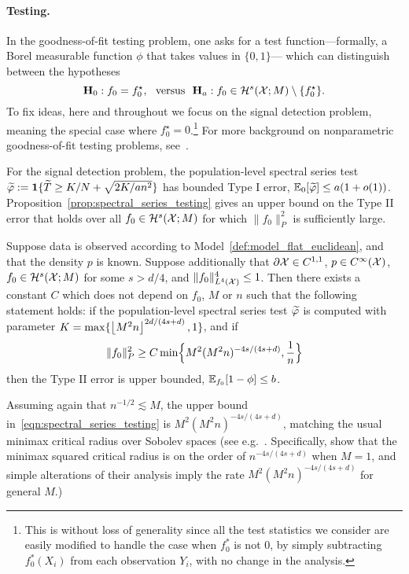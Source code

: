 \paragraph{Testing.}
In the goodness-of-fit testing problem, one asks for a test function---formally, a Borel measurable function $\phi$ that takes values in $\{0,1\}$--- which can distinguish between the hypotheses
\begin{equation}
\mathbf{H}_0: f_0 = f_0^{\star}, ~~\textrm{versus}~~ \mathbf{H}_a: f_0 \in \mathcal{H}^{s}(\mathcal{X};M) \setminus \{f_0^{\star}\}.
\end{equation} 
To fix ideas, here and throughout we focus on the signal detection problem, meaning the special case where $f_0^{\star} = 0$.\footnote{This is without loss of generality since all the test statistics we consider are easily modified to handle the case when $f_0^{\ast}$ is not $0$, by simply subtracting $f_0^{\ast}(X_i)$ from each observation $Y_i$, with no change in the analysis.} For more background on nonparametric goodness-of-fit testing problems, see~\cite{ingster2012}.

For the signal detection problem, the population-level spectral series test $\widetilde{\varphi} := \mathbf{1}\{\widetilde{T} \geq K/N + \sqrt{2K/an^2}\}$ has bounded Type I error, $\mathbb{E}_{0}[\widetilde{\varphi}] \leq a (1 + o(1))$. Proposition~\ref{prop:spectral_series_testing} gives an upper bound on the Type II error that holds over all $f_0 \in \mathcal{H}^s(\mathcal{X};M)$ for which $\|f_0\|_P^2$ is sufficiently large.
\begin{proposition}
	\label{prop:spectral_series_testing}
	Suppose data is observed according to Model~\ref{def:model_flat_euclidean}, and that the density $p$ is known.  Suppose additionally that $\partial \mathcal{X} \in C^{1,1}$, $p \in C^{\infty}(\mathcal{X})$, $f_0 \in \mathcal{H}^{s}(\mathcal{X};M)$ for some $s > d/4$, and $\|f_0\|_{L^4(\mathcal{X})}^4 \leq 1$. Then there exists a constant $C$ which does not depend on $f_0$, $M$ or $n$ such that the following statement holds: if the population-level spectral series test $\widetilde{\varphi}$ is computed with parameter $K = \max\{\left\lfloor M^2n \right\rfloor^{2d/(4s + d)},1\}$, and if
	\begin{equation}
	\label{eqn:spectral_series_testing}
	\|f_0\|_P^2 \geq C\min\Bigl\{M^2(M^2n)^{-4s/(4s + d)}, \frac{1}{n}\Bigr\}
	\end{equation}
	then the Type II error is upper bounded, $\mathbb{E}_{f_0}[1 - \phi] \leq b$.
\end{proposition}
Assuming again that $n^{-1/2} \lesssim M$, the upper bound in~\eqref{eqn:spectral_series_testing} is $M^2(M^2n)^{-4s/(4s + d)}$, matching the usual minimax critical radius over Sobolev spaces (see e.g.~\cite{guerre02,ingster2009,ingster2012}. Specifically, \cite{ingster2009} show that the minimax squared critical radius is on the order of $n^{-4s/(4s + d)}$ when $M = 1$, and simple alterations of their analysis imply the rate $M^2(M^2n)^{-4s/(4s + d)}$ for general $M$.) 

